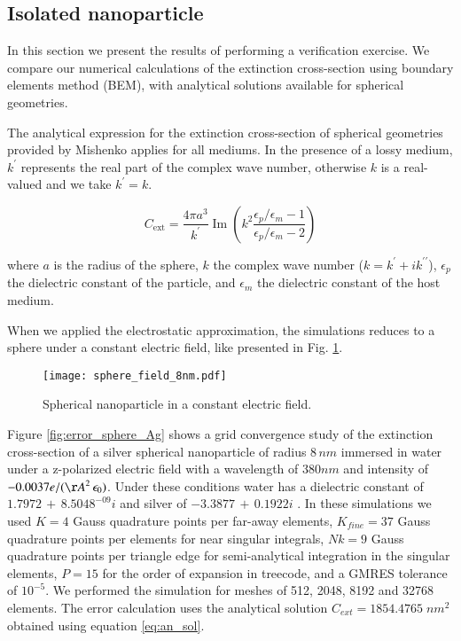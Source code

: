 
\subsection{Isolated nanoparticle} \label{sec:verification}

In this section we present the results of performing a verification exercise. We
compare our numerical calculations of the extinction cross-section using boundary
elements method (BEM), with analytical solutions available for spherical geometries. 

The analytical expression for the extinction cross-section of spherical geometries
provided by Mishenko \cite{Mishchenko2007} applies for all mediums. In the presence
of a lossy medium, $k^\prime$ represents the real part of the complex wave number,
otherwise $k$ is a real-valued and we take $k^\prime = k$. 


\begin{equation} 
    C_\text{ext} = \frac{4\pi a^3}{k^\prime} \operatorname{Im}\left(k^2 
                    \frac{\epsilon_p/\epsilon_m -1}{\epsilon_p/\epsilon_m -2}\right)
    \label{eq:an_sol}
\end{equation}

where $a$ is the radius of the sphere, $k$ the complex wave number ($k=k^\prime +i k^{\prime\prime}$), $\epsilon_p$ 
the dielectric constant of the particle, and $\epsilon_m$ the dielectric constant
of the host medium. 

When we applied the electrostatic approximation, the simulations reduces to a 
sphere under a constant electric field, like presented in Fig. \ref{fig:np_elec_field}.

\begin{figure}[h] %
   \centering
   \texttt{[image: sphere\_field\_8nm.pdf]} 
   \caption{Spherical nanoparticle in a constant electric field.}
   \label{fig:np_elec_field}
\end{figure}

Figure \ref{fig:error_sphere_Ag} shows a grid convergence study of the extinction
cross-section of a silver spherical nanoparticle of radius $8 \, nm$ immersed in water
under a z-polarized electric field with a wavelength of $380 nm$ and intensity of 
$-0.0037 e/({\AA}^2 \, \epsilon_0)$. Under these conditions water has a dielectric
constant of $1.7972 \, + \, 8.5048^{-09}i$ \cite{JohnsonChristy1972} and silver of
$-3.3877 \, + \, 0.1922i$ \cite{HaleQuerry1972}. In these simulations we used $K=4$ 
Gauss quadrature points per far-away elements, $K_{fine} = 37$ Gauss quadrature points
per elements for near singular integrals, $Nk = 9$ Gauss quadrature points per 
triangle edge for semi-analytical integration in the singular elements, $P=15$ for 
the order of expansion in treecode, and a GMRES tolerance of $10^{-5}$. We
performed the simulation for meshes of 512, 2048, 8192 and 32768 elements. The 
error calculation uses the analytical solution $C_{ext} = 1854.4765 \; nm^2$ 
obtained using equation \eqref{eq:an_sol}.

